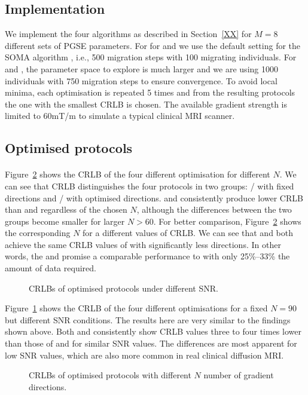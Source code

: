 \subsection{Implementation}
We implement the four algorithms as described in Section~\ref{XX}  for $M=8$ different sets of PGSE parameters. For for {\OI} and {\SD} we use the default setting for the SOMA algorithm , i.e., 500 migration steps with 100 migrating individuals. For {\DO} and {\SD}, the parameter space to explore is much larger and we are using 1000 individuals with 750 migration steps to ensure convergence. To avoid local minima, each optimisation is repeated 5 times and from the resulting protocols the one with the smallest CRLB is chosen. The available gradient strength is limited to 60mT/m to simulate a typical clinical MRI scanner.

\subsection{Optimised protocols}
\paragraph{}
Figure~\ref{fig:chapter7 exp1 DIRS vs CRLB} shows the CRLB of the four different optimisation for different $N$. We can see that CRLB distinguishes the four protocols in two groups: {\OI}/{\SD} with fixed directions and {\DO}/{\FD} with optimised directions. {\DO} and {\FD} consistently produce lower CRLB than {\OI} and {\SD} regardless of the chosen $N$, although the differences between the two groups become smaller for larger $N > 60$. For better comparison, Figure~\ref{fig:chapter7 exp1 DIRS vs CRLB} shows the corresponding $N$ for a different values of CRLB. We can see that {\FD} and {\DO} both achieve the same CRLB values of {\OI} with significantly less directions. In other words, the {\DO} and {\FD} promise a comparable performance to {\OI} with only 25\%--33\% the amount of data required.

\begin{figure}[H]
	\centering
	
	\caption{CRLBs of optimised protocols under different SNR.}
	\label{fig:chapter7 exp1 SNR vs CRLB}
\end{figure}

Figure~\ref{fig:chapter7 exp1 SNR vs CRLB} shows the CRLB of the four different optimisations for a fixed $N=90$ but different SNR conditions. The results here are very similar to the findings shown above. Both {\FD} and {\DO} consistently show CRLB values three to four times lower than those of {\OI} and {\SD} for similar SNR values. The differences are most apparent for low SNR values, which are also more common in real clinical diffusion MRI.
\begin{figure}[H]
	\centering
	
	\caption{CRLBs of optimised protocols with different $N$  number of gradient directions.}
	\label{fig:chapter7 exp1 DIRS vs CRLB}
\end{figure}
